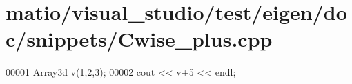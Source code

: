 \hypertarget{matio_2visual__studio_2test_2eigen_2doc_2snippets_2_cwise__plus_8cpp_source}{}\section{matio/visual\+\_\+studio/test/eigen/doc/snippets/\+Cwise\+\_\+plus.cpp}
\label{matio_2visual__studio_2test_2eigen_2doc_2snippets_2_cwise__plus_8cpp_source}

\begin{DoxyCode}
00001 Array3d v(1,2,3);
00002 cout << v+5 << endl;
\end{DoxyCode}
